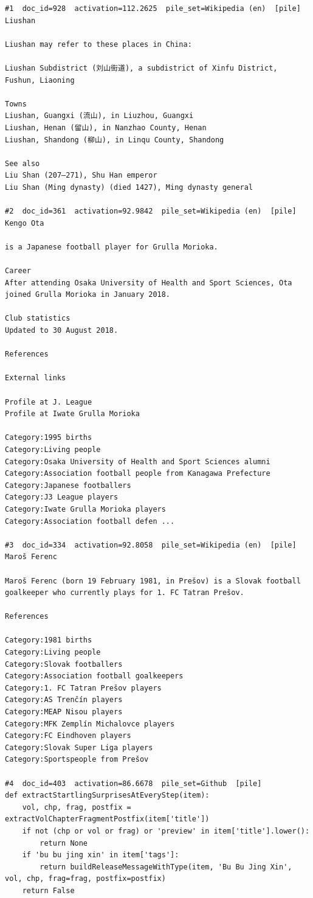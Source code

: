 \begin{verbatim}
#1  doc_id=928  activation=112.2625  pile_set=Wikipedia (en)  [pile]
Liushan

Liushan may refer to these places in China:

Liushan Subdistrict (刘山街道), a subdistrict of Xinfu District, Fushun, Liaoning

Towns
Liushan, Guangxi (流山), in Liuzhou, Guangxi
Liushan, Henan (留山), in Nanzhao County, Henan
Liushan, Shandong (柳山), in Linqu County, Shandong

See also
Liu Shan (207–271), Shu Han emperor
Liu Shan (Ming dynasty) (died 1427), Ming dynasty general

#2  doc_id=361  activation=92.9842  pile_set=Wikipedia (en)  [pile]
Kengo Ota

is a Japanese football player for Grulla Morioka.

Career
After attending Osaka University of Health and Sport Sciences, Ota joined Grulla Morioka in January 2018.

Club statistics
Updated to 30 August 2018.

References

External links

Profile at J. League
Profile at Iwate Grulla Morioka

Category:1995 births
Category:Living people
Category:Osaka University of Health and Sport Sciences alumni
Category:Association football people from Kanagawa Prefecture
Category:Japanese footballers
Category:J3 League players
Category:Iwate Grulla Morioka players
Category:Association football defen ...

#3  doc_id=334  activation=92.8058  pile_set=Wikipedia (en)  [pile]
Maroš Ferenc

Maroš Ferenc (born 19 February 1981, in Prešov) is a Slovak football goalkeeper who currently plays for 1. FC Tatran Prešov.

References

Category:1981 births
Category:Living people
Category:Slovak footballers
Category:Association football goalkeepers
Category:1. FC Tatran Prešov players
Category:AS Trenčín players
Category:MEAP Nisou players
Category:MFK Zemplín Michalovce players
Category:FC Eindhoven players
Category:Slovak Super Liga players
Category:Sportspeople from Prešov

#4  doc_id=403  activation=86.6678  pile_set=Github  [pile]
def extractStartlingSurprisesAtEveryStep(item):
	vol, chp, frag, postfix = extractVolChapterFragmentPostfix(item['title'])
	if not (chp or vol or frag) or 'preview' in item['title'].lower():
		return None
	if 'bu bu jing xin' in item['tags']:
		return buildReleaseMessageWithType(item, 'Bu Bu Jing Xin', vol, chp, frag=frag, postfix=postfix)
	return False



\end{verbatim}
